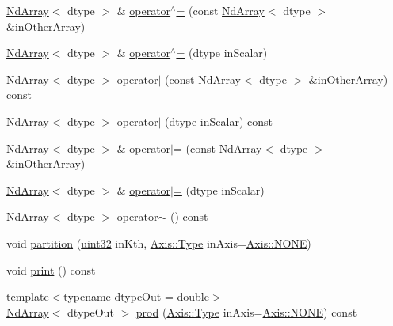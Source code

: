 \begin{DoxyCompactItemize}
\item 
\mbox{\hyperlink{class_num_cpp_1_1_nd_array}{Nd\+Array}}$<$ dtype $>$ \& \mbox{\hyperlink{class_num_cpp_1_1_nd_array_ad9fe6ed22c3afc02250f275e098155bd}{operator$^\wedge$=}} (const \mbox{\hyperlink{class_num_cpp_1_1_nd_array}{Nd\+Array}}$<$ dtype $>$ \&in\+Other\+Array)
\item 
\mbox{\hyperlink{class_num_cpp_1_1_nd_array}{Nd\+Array}}$<$ dtype $>$ \& \mbox{\hyperlink{class_num_cpp_1_1_nd_array_a956700ddc71d08da7257b3bf78a2bb2b}{operator$^\wedge$=}} (dtype in\+Scalar)
\item 
\mbox{\hyperlink{class_num_cpp_1_1_nd_array}{Nd\+Array}}$<$ dtype $>$ \mbox{\hyperlink{class_num_cpp_1_1_nd_array_a59cb53c065f76dcec0f4022ab011226c}{operator$\vert$}} (const \mbox{\hyperlink{class_num_cpp_1_1_nd_array}{Nd\+Array}}$<$ dtype $>$ \&in\+Other\+Array) const
\item 
\mbox{\hyperlink{class_num_cpp_1_1_nd_array}{Nd\+Array}}$<$ dtype $>$ \mbox{\hyperlink{class_num_cpp_1_1_nd_array_a69a9c4030e65217685e7cb6b03d6eba2}{operator$\vert$}} (dtype in\+Scalar) const
\item 
\mbox{\hyperlink{class_num_cpp_1_1_nd_array}{Nd\+Array}}$<$ dtype $>$ \& \mbox{\hyperlink{class_num_cpp_1_1_nd_array_aeaf25d48fe00c111273c7a4b3e80af24}{operator$\vert$=}} (const \mbox{\hyperlink{class_num_cpp_1_1_nd_array}{Nd\+Array}}$<$ dtype $>$ \&in\+Other\+Array)
\item 
\mbox{\hyperlink{class_num_cpp_1_1_nd_array}{Nd\+Array}}$<$ dtype $>$ \& \mbox{\hyperlink{class_num_cpp_1_1_nd_array_aae07ecfd7c8531ca9d9379e58f4b590d}{operator$\vert$=}} (dtype in\+Scalar)
\item 
\mbox{\hyperlink{class_num_cpp_1_1_nd_array}{Nd\+Array}}$<$ dtype $>$ \mbox{\hyperlink{class_num_cpp_1_1_nd_array_a07f036e8ef7e876aca9689c79938bd6f}{operator$\sim$}} () const
\item 
void \mbox{\hyperlink{class_num_cpp_1_1_nd_array_a54144687b3985cf5c5d2a9ea6c3676a7}{partition}} (\mbox{\hyperlink{namespace_num_cpp_a36f388e948380413c63011cab9b7fbd5}{uint32}} in\+Kth, \mbox{\hyperlink{struct_num_cpp_1_1_axis_ac10eb76f8631762d9ed70c40c42ca6cb}{Axis\+::\+Type}} in\+Axis=\mbox{\hyperlink{struct_num_cpp_1_1_axis_ac10eb76f8631762d9ed70c40c42ca6cba747ae657022cca1d87702b56d0c038e9}{Axis\+::\+N\+O\+NE}})
\item 
void \mbox{\hyperlink{class_num_cpp_1_1_nd_array_aaadbea71587fe5692e7a6ce15dc46158}{print}} () const
\item 
{\footnotesize template$<$typename dtype\+Out  = double$>$ }\\\mbox{\hyperlink{class_num_cpp_1_1_nd_array}{Nd\+Array}}$<$ dtype\+Out $>$ \mbox{\hyperlink{class_num_cpp_1_1_nd_array_a371f65dfdd0e8b1bf1bdb0a66b5720a6}{prod}} (\mbox{\hyperlink{struct_num_cpp_1_1_axis_ac10eb76f8631762d9ed70c40c42ca6cb}{Axis\+::\+Type}} in\+Axis=\mbox{\hyperlink{struct_num_cpp_1_1_axis_ac10eb76f8631762d9ed70c40c42ca6cba747ae657022cca1d87702b56d0c038e9}{Axis\+::\+N\+O\+NE}}) const

\end{DoxyCompactItemize}
